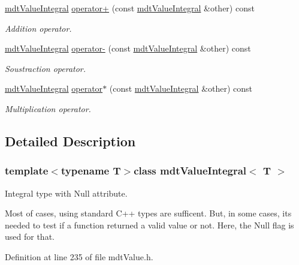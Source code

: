 \begin{DoxyCompactItemize}
\hyperlink{classmdt_value_integral}{mdt\-Value\-Integral} \hyperlink{classmdt_value_integral_a63b608faed5f0d348bd67c731fa3a0b8}{operator+} (const \hyperlink{classmdt_value_integral}{mdt\-Value\-Integral} \&other) const 
\begin{DoxyCompactList}\small\item\em Addition operator. \end{DoxyCompactList}\item 
\hyperlink{classmdt_value_integral}{mdt\-Value\-Integral} \hyperlink{classmdt_value_integral_a3a13deb1355d6cf63c2f05f4e15b9743}{operator-\/} (const \hyperlink{classmdt_value_integral}{mdt\-Value\-Integral} \&other) const 
\begin{DoxyCompactList}\small\item\em Soustraction operator. \end{DoxyCompactList}\item 
\hyperlink{classmdt_value_integral}{mdt\-Value\-Integral} \hyperlink{classmdt_value_integral_a5f52adbe77b7b0314ddb3322d3b52d7f}{operator$\ast$} (const \hyperlink{classmdt_value_integral}{mdt\-Value\-Integral} \&other) const 
\begin{DoxyCompactList}\small\item\em Multiplication operator. \end{DoxyCompactList}\end{DoxyCompactItemize}


\subsection{Detailed Description}
\subsubsection*{template$<$typename T$>$class mdt\-Value\-Integral$<$ T $>$}

Integral type with Null attribute. 

Most of cases, using standard C++ types are sufficent. But, in some cases, its needed to test if a function returned a valid value or not. Here, the Null flag is used for that. 

Definition at line 235 of file mdt\-Value.\-h.



